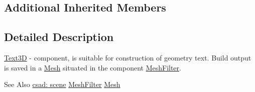 \subsection*{Additional Inherited Members}


\subsection{Detailed Description}
\hyperlink{classcsad_1_1_text3_d}{Text3\-D} -\/ component, is suitable for construction of geometry text. Build output is saved in a \hyperlink{classcsad_1_1_mesh}{Mesh} situated in the component \hyperlink{classcsad_1_1_mesh_filter}{Mesh\-Filter}. 

\begin{DoxySeeAlso}{See Also}
\hyperlink{group__scene}{csad\-: scene} \hyperlink{classcsad_1_1_mesh_filter}{Mesh\-Filter} \hyperlink{classcsad_1_1_mesh}{Mesh} 
\end{DoxySeeAlso}
